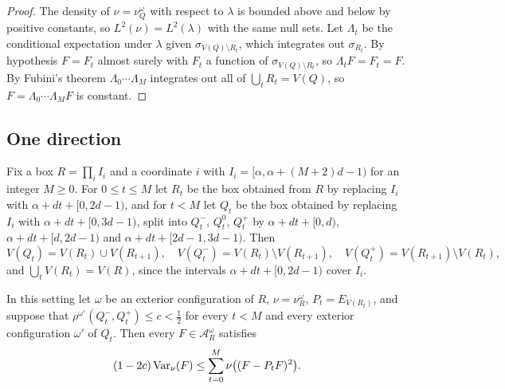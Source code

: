 \begin{proof}
The density of $\nu=\nu^\omega_Q$ with respect to $\lambda$ is bounded above
and below by positive constants, so $L^2(\nu)=L^2(\lambda)$ with the same
null sets. Let $\Lambda_t$ be the conditional expectation under $\lambda$
given $\sigma_{V(Q)\setminus R_t}$, which integrates out $\sigma_{R_t}$. By
hypothesis $F=F_t$ almost surely with $F_t$ a function of
$\sigma_{V(Q)\setminus R_t}$, so $\Lambda_tF=F_t=F$. By Fubini's theorem
$\Lambda_0\cdots\Lambda_M$ integrates out all of $\bigcup_tR_t=V(Q)$, so
$F=\Lambda_0\cdots\Lambda_MF$ is constant.
\end{proof}

\subsection{One direction}

Fix a box $R=\prod_iI_i$ and a coordinate $i$ with $I_i=[\alpha,\alpha+
(M+2)d-1)$ for an integer $M\ge0$. For $0\le t\le M$ let $R_t$ be the box
obtained from $R$ by replacing $I_i$ with $\alpha+dt+[0,2d-1)$, and for
$t<M$ let $Q_t$ be the box obtained by replacing $I_i$ with $\alpha+dt+
[0,3d-1)$, split into $Q_t^-$, $Q_t^0$, $Q_t^+$ by $\alpha+dt+[0,d)$,
$\alpha+dt+[d,2d-1)$ and $\alpha+dt+[2d-1,3d-1)$. Then
\begin{equation}\label{eq:slabs}
V(Q_t)=V(R_t)\cup V(R_{t+1}),\quad V(Q_t^-)=V(R_t)\setminus V(R_{t+1}),
\quad V(Q_t^+)=V(R_{t+1})\setminus V(R_t),
\end{equation}
and $\bigcup_tV(R_t)=V(R)$, since the intervals $\alpha+dt+[0,2d-1)$ cover
$I_i$.

\begin{proposition}\label{prop:slab}
In this setting let $\omega$ be an exterior configuration of $R$,
$\nu=\nu^\omega_R$, $P_t=E_{V(R_t)}$, and suppose that $\rho^{\omega'}(Q^-_t,
Q^+_t)\le c<\frac12$ for every $t<M$ and every exterior configuration
$\omega'$ of $Q_t$. Then every $F\in\mathcal A^\omega_R$ satisfies
\[
(1-2c)\operatorname{Var}_\nu(F)\le\sum_{t=0}^M\nu\bigl((F-P_tF)^2\bigr).
\]
\end{proposition}

